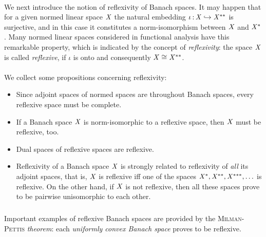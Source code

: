 \documentclass[11pt,twoside]{article}
\begin{document}
\paragraph*{} %
We next introduce the notion of reflexivity of Banach spaces.
It may happen
that for a given normed linear space $\mathit{X}$
the natural embedding
$\iota{\,:\,} \mathit{X} \hookrightarrow \mathit{X}^{**}$ is surjective,
and in this case
it constitutes a norm-isomorphism between $\mathit{X}$ and $\mathit{X}^*$.
Many normed linear spaces considered in functional analysis
have this remarkable property,
which is indicated by the concept of \textit{reflexivity}:
the space $\mathit{X}$ is called \textit{reflexive},
if $\iota$ is onto and consequently $\mathit{X} \cong \mathit{X}^{**}$.

\paragraph*{} %
We collect some propositions concerning reflexivity:

\begin{itemize}[leftmargin=35pt]
\item[1.]
Since adjoint spaces of normed spaces are throughout Banach spaces,
every reflexive space must be complete.

\item[2.]
If a Banach space $\mathit{X}$ is norm-isomorphic to a reflexive space,
then $\mathit{X}$ must be reflexive, too.


\item[3.]
Dual spaces of reflexive spaces are reflexive.

\item[4.]
Reflexivity of a Banach space $\mathit{X}$ is strongly related to reflexivity
of \textit{all} its adjoint spaces,
that is,
$\mathit{X}$ is reflexive
iff
one of the spaces
$
\mathit{X}^{*}, \mathit{X}^{**}, \mathit{X}^{***}, \ldots
$
is reflexive.
On the other hand,
if $\mathit{X}$ is not reflexive,
then all these spaces prove to be pairwise unisomorphic to each other.
\end{itemize}

\subparagraph*{} %
Important examples of reflexive Banach spaces are provided
by the \textsc{Milman-Pettis} \textit{theorem}:
each \textit{uniformly convex Banach space} proves to be reflexive.
\end{document}
